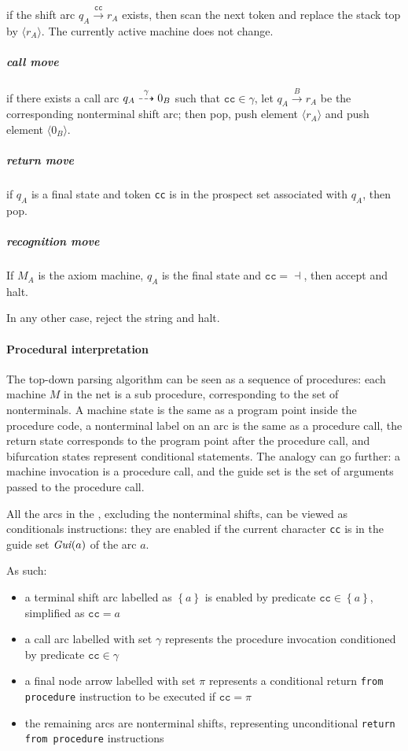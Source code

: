 \documentclass[english]{article}
\begin{document}
if the shift arc \(q_A \xrightarrow{\texttt{cc}} r_A\) exists, then scan the next token and replace the stack top by \(\langle r_A\rangle\).
The currently active machine does not change.

\subparagraph*{call move}

if there exists a call arc \(q_A \stackrel{\gamma}{\dashrightarrow} 0_B\) such that \(\texttt{cc} \in \gamma\), let \(q_A \xrightarrow{B} r_A\) be the corresponding nonterminal shift arc;
then pop, push element \(\langle r_A \rangle\) and push element \(\langle 0_B \rangle\).

\subparagraph*{return move}

if \(q_A\) is a final state and token \texttt{cc} is in the prospect set associated with \(q_A\), then pop.

\subparagraph*{recognition move}

If \(M_A\) is the axiom machine, \(q_A\) is the final state and \(\texttt{cc} = \dashv\), then accept and halt.

In any other case, reject the string and halt.

\paragraph{Procedural interpretation}

The top-down parsing algorithm can be seen as a sequence of procedures:
each machine \(M\) in the net is a sub procedure, corresponding to the set of nonterminals.
A machine state is the same as a program point inside the procedure code, a nonterminal label on an arc is the same as a procedure call, the return state corresponds to the program point after the procedure call, and bifurcation states represent conditional statements.
The analogy can go further: a machine invocation is a procedure call, and the guide set is the set of arguments passed to the procedure call.

\bigskip
All the arcs in the \PCFG, excluding the nonterminal shifts, can be viewed as conditionals instructions:
they are enabled if the current character \texttt{cc} is in the guide set \(\textit{Gui}\hspace{0.1ex}(a)\) of the arc \(a\).

As such:

\begin{itemize}
  \item a terminal shift arc labelled as \(\left\{ a \right\}\) is enabled by predicate \(\texttt{cc} \in \left\{ a \right\}\), simplified as \(\texttt{cc}=a\)
  \item a call arc labelled with set \(\gamma\) represents the procedure invocation conditioned by predicate \(\texttt{cc} \in \gamma\)
  \item a final node arrow labelled with set \(\pi\) represents a conditional return \texttt{from procedure} instruction to be executed if \(\texttt{cc}=\pi\)
  \item the remaining \PCFG arcs are nonterminal shifts, representing unconditional \texttt{return from procedure} instructions
\end{itemize}
\end{document}
